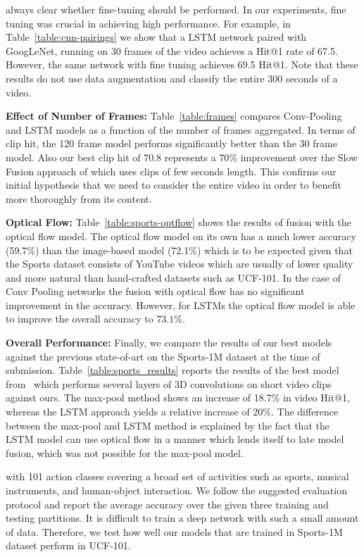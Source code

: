 \documentclass[10pt,twocolumn,letterpaper]{article}
\begin{document}
always clear whether fine-tuning should be performed. In our experiments, fine
tuning was crucial in achieving high performance. For example, in
Table~\ref{table:cnn-pairings} we show that a LSTM network paired with
GoogLeNet, running on 30 frames of the video achieves a Hit@1 rate of 67.5. However,
the same network with fine tuning achieves 69.5 Hit@1. Note that these results do not use
data augmentation and classify the entire 300 seconds of a video.

\textbf{Effect of Number of Frames:}
Table~\ref{table:frames} compares Conv-Pooling and LSTM models as a function of the number of frames aggregated. In terms of clip hit, the 120 frame model
 performs significantly better than the 30 frame model.
Also our best clip hit of $70.8$ represents a $70\%$ improvement over the Slow Fusion approach of \cite{karpathy2014large} which uses
clips of few seconds length. This confirms our initial hypothesis that we need to consider the entire video in order to benefit
more thoroughly from its content.

\textbf{Optical Flow:}%
Table~\ref{table:sports-optflow} shows the results of fusion with the optical
flow model. The optical flow model on its own has a much lower accuracy
(59.7\%) than the image-based model (72.1\%) which is to be expected given that
the Sports dataset consists of YouTube videos which are usually of lower
quality and more natural than hand-crafted datasets such as UCF-101. In the
case of Conv Pooling networks the fusion with optical flow has no significant
improvement in the accuracy.  However, for LSTMs the optical flow model is able
to improve the overall accuracy to $73.1\%$.

\textbf{Overall Performance:}
Finally, we compare the results of our best models against the previous
state-of-art on the Sports-1M dataset at the time of submission.
Table~\ref{table:sports_results} reports the results of the best model
from~\cite{karpathy2014large} which performs several layers of 3D convolutions
on short video clips against ours.  The max-pool method shows an increase of
18.7\% in video Hit@1, whereas the LSTM approach yields a relative increase of 20\%.
The difference between the max-pool and LSTM method is explained by the fact
that the LSTM model can use optical flow in a manner which lends itself to late
model fusion, which was not possible for the max-pool model.

with 101 action classes covering a broad set of activities such as sports,
musical instruments, and human-object interaction.  We follow the suggested
evaluation protocol and report the average accuracy over the given three
training and testing partitions. It is difficult to train a deep network with
such a small amount of data. Therefore, we test how well our models that are
trained in Sports-1M dataset perform in UCF-101.
\end{document}
